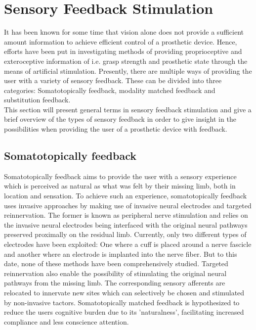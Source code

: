 \section{Sensory Feedback Stimulation}

It has been known for some time that vision alone does not provide a sufficient amount information to achieve efficient control of a prosthetic device. Hence, efforts have been put in investigating methods of providing proprioceptive and exteroceptive information of i.e. grasp strength and prosthetic state through the means of artificial stimulation. \cite{Schofield2014,Stephens-Fripp2018} Presently, there are multiple ways of providing the user with a variety of sensory feedback. These can be divided into three categories: Somatotopically feedback, modality matched feedback and substitution feedback. \cite{Schofield2014} \\
This section will present general terms in sensory feedback stimulation and give a brief overview of the types of sensory feedback in order to give insight in the possibilities when providing the user of a prosthetic device with feedback.

\subsection{Somatotopically feedback}

Somatotopically feedback aims to provide the user with a sensory experience which is perceived as natural as what was felt by their missing limb, both in location and sensation. To achieve such an experience, somatotopically feedback uses invasive approaches by making use of invasive neural electrodes and targeted reinnervation. The former is known as peripheral nerve stimulation and relies on the invasive neural electrodes being interfaced with the original neural pathways preserved proximally on the residual limb. Currently, only two different types of electrodes have been exploited: One where a cuff is placed around a nerve fascicle and another where an electrode is implanted into the nerve fiber. But to this date, none of these methods have been comprehensively studied. Targeted reinnervation also enable the possibility of stimulating the original neural pathways from the missing limb. The corresponding sensory afferents are relocated to innervate new sites which can selectively be chosen and stimulated by non-invasive tactors. Somatotopically matched feedback is hypothesized to reduce the users cognitive burden due to its 'naturalness', facilitating increased compliance and less conscience attention. \cite{Schofield2014}  

